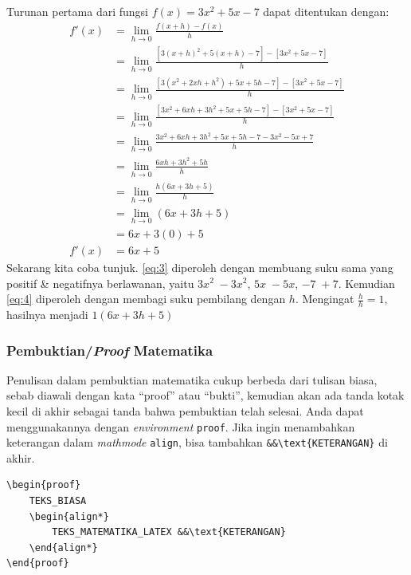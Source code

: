 \begin{enumerate}[label=\arabic*)]
    Turunan pertama dari fungsi $f(x) = 3x^2 + 5x − 7$ dapat ditentukan dengan:
    \begin{align}
        f'(x) &= \lim_{h \to 0} \frac{f(x+h) - f(x)}{h} \nonumber \\
        &= \lim_{h \to 0} \frac{[3(x+h)^2 + 5(x+h) - 7] - [3x^2 + 5x - 7]}{h} \nonumber \\
        &= \lim_{h \to 0} \frac{[3(x^2 + 2xh + h^2) + 5x + 5h - 7] - [3x^2 + 5x - 7]}{h} \nonumber \\
        &= \lim_{h \to 0} \frac{[3x^2 + 6xh + 3h^2 + 5x + 5h - 7] - [3x^2 + 5x - 7]}{h} \nonumber \\
        &= \lim_{h \to 0} \frac{3x^2 + 6xh + 3h^2 + 5x + 5h - 7 - 3x^2 - 5x + 7}{h} \nonumber \\
        &= \lim_{h \to 0} \frac{6xh + 3h^2 + 5h}{h} \label{eq:3} \\
        &= \lim_{h \to 0} \frac{h(6x + 3h + 5)}{h} \nonumber \\
        &= \lim_{h \to 0} (6x + 3h + 5) \label{eq:4} \\
        &= 6x + 3(0) + 5 \nonumber \\
        f'(x) &= 6x + 5 \nonumber
    \end{align}
    Sekarang kita coba tunjuk. \autoref{eq:3} diperoleh dengan membuang suku sama yang positif \& negatifnya berlawanan, yaitu $3x^2\; -3x^2$, $5x\; -5x$, $-7\; +7$. Kemudian \autoref{eq:4} diperoleh dengan membagi suku pembilang dengan $h$. Mengingat $\frac{h}{h} = 1$, hasilnya menjadi $1(6x + 3h + 5)$
\end{enumerate}

\subsubsection{Pembuktian/\textit{Proof} Matematika}

Penulisan dalam pembuktian matematika cukup berbeda dari tulisan biasa, sebab diawali dengan kata ``proof'' atau ``bukti'', kemudian akan ada tanda kotak kecil di akhir sebagai tanda bahwa pembuktian telah selesai. Anda dapat menggunakannya dengan \textit{environment} \texttt{proof}. Jika ingin menambahkan keterangan dalam \textit{mathmode} \texttt{align}, bisa tambahkan \verb|&&\text{KETERANGAN}| di akhir.

\begin{lstlisting}[]
\begin{proof}
    TEKS_BIASA
    \begin{align*}
        TEKS_MATEMATIKA_LATEX &&\text{KETERANGAN}
    \end{align*}
\end{proof}
\end{lstlisting}

